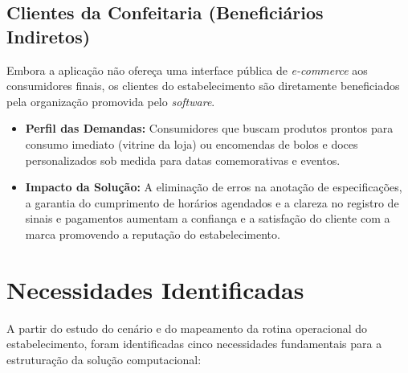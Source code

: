 \subsection{Clientes da Confeitaria (Beneficiários Indiretos)}

Embora a aplicação não ofereça uma interface pública de \textit{e-commerce} aos consumidores finais, os clientes do estabelecimento são diretamente beneficiados pela organização promovida pelo \textit{software}.

\begin{itemize}
    \item \textbf{Perfil das Demandas:} Consumidores que buscam produtos prontos para consumo imediato (vitrine da loja) ou encomendas de bolos e doces personalizados sob medida para datas comemorativas e eventos.
    \item \textbf{Impacto da Solução:} A eliminação de erros na anotação de especificações, a garantia do cumprimento de horários agendados e a clareza no registro de sinais e pagamentos aumentam a confiança e a satisfação do cliente com a marca promovendo a reputação do estabelecimento.
\end{itemize}

\section{Necessidades Identificadas}
A partir do estudo do cenário e do mapeamento da rotina operacional do estabelecimento, foram identificadas cinco necessidades fundamentais para a estruturação da solução computacional:

